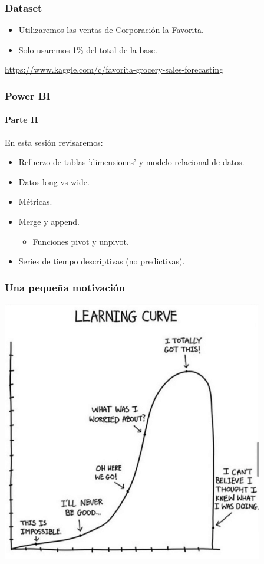 \documentclass{beamer}
\begin{document}
\begin{frame}
	\frametitle{Dataset}
	\begin{itemize}
		\item Utilizaremos las ventas de Corporación la Favorita.
		\item Solo usaremos 1\% del total de la base. \\
	\end{itemize}	
	\small{\url{https://www.kaggle.com/c/favorita-grocery-sales-forecasting}}
	
\end{frame}

\begin{frame}
	\centering
	\frametitle<presentation>{Power BI}
	\framesubtitle{Parte II}
	En esta sesión revisaremos:
	\begin{itemize}
		\item Refuerzo de tablas 'dimensiones' y modelo relacional de datos.
		\item Datos long vs wide.
		\item Métricas.
		\item Merge y append.
		\begin{itemize}
			\item Funciones pivot y unpivot.
		\end{itemize}
		\item Series de tiempo descriptivas (no predictivas).
	\end{itemize}
  \end{frame}

  \begin{frame}
	\frametitle{Una pequeña motivación}
	\centering
	\includegraphics[scale=0.50]{learning-curve.png} \\
  \end{frame}
  
\end{document}
